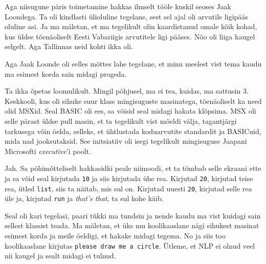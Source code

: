 Aga niisugune päris toimetamine hakkas ilmselt  tööle kuskil seoses Jaak Loondega. Ta oli kindlasti ülioluline tegelane, sest sel ajal oli arvutile ligipääs oluline asi. Ja ma mäletan, et ma tegelikult olin kaardistanud omale kõik kohad, kus üldse  tõenäoliselt Eesti Vabariigis arvutitele ligi pääses. Nõo oli liiga kaugel selgelt. Aga Tallinnas neid kohti ikka oli. 

Aga Jaak Loonde oli selles mõttes lahe tegelane, et minu meelest vist tema kaudu ma esimest korda sain midagi progeda. 


Ta ikka õpetas loomulikult. Mingil põhjusel, ma ei tea, kuidas, ma sattusin  3. Keskkooli, kus oli sihuke suur klass mingisuguste masinatega, tõenäoliselt ka need olid MSXid. Seal BASIC oli ees, sa võisid seal midagi hakata klõpsima. MSX oli selle pärast  üldse pull masin, et  ta tegelikult vist mõeldi välja, tagantjärgi tarkusega võin öelda, selleks, et ühtlustada koduarvutite standardit ja BASICuid, mida nad jooksutaksid.  See initsiatiiv oli isegi tegelikult  mingisuguse Jaapani Microsofti \emph{executive}'i poolt.


Jah. Sa põhimõtteliselt hakkasidki peale niimoodi, et ta tõmbab selle ekraani ette ja sa võid seal kirjutada \verb|10| ja siis kirjutada ühe rea. Kirjutad \verb|20|, kirjutad teise rea, ütled \verb|list|, siis ta  näitab, mis sul on. Kirjutad uuesti \verb|20|, kirjutad selle rea üle ja, kirjutad \verb|run| ja \emph{that's that}, ta sul kohe käib. 

Seal oli kari tegelasi, paari tükki ma tundsin ja nende kaudu ma vist kuidagi sain sellest klassist teada. Ma mäletan, et üks mu koolikaaslane nägi sihukest masinat esimest korda ja meile öeldigi, et hakake midagi tegema. No ja siis too koolikaaslane kirjutas \verb|please draw me a circle|. Ütleme, et NLP ei olnud veel nii kaugel ja sealt midagi ei tulnud.


